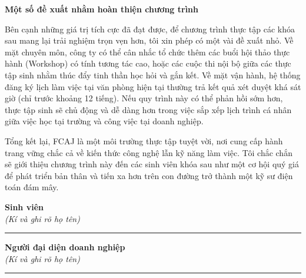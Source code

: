 \vspace{0.2cm}
\noindent\textbf{Một số đề xuất nhằm hoàn thiện chương trình}

Bên cạnh những giá trị tích cực đã đạt được, để chương trình thực tập các khóa sau mang lại trải nghiệm trọn vẹn hơn, tôi xin phép có một vài đề xuất nhỏ. Về mặt chuyên môn, công ty có thể cân nhắc tổ chức thêm các buổi hội thảo thực hành (Workshop) có tính tương tác cao, hoặc các cuộc thi nội bộ giữa các thực tập sinh nhằm thúc đẩy tinh thần học hỏi và gắn kết. Về mặt vận hành, hệ thống đăng ký lịch làm việc tại văn phòng hiện tại thường trả kết quả xét duyệt khá sát giờ (chỉ trước khoảng 12 tiếng). Nếu quy trình này có thể phản hồi sớm hơn, thực tập sinh sẽ chủ động và dễ dàng hơn trong việc sắp xếp lịch trình cá nhân giữa việc học tại trường và công việc tại doanh nghiệp.

Tổng kết lại, FCAJ là một môi trường thực tập tuyệt vời, nơi cung cấp hành trang vững chắc cả về kiến thức công nghệ lẫn kỹ năng làm việc. Tôi chắc chắn sẽ giới thiệu chương trình này đến các sinh viên khóa sau như một cơ hội quý giá để phát triển bản thân và tiến xa hơn trên con đường trở thành một kỹ sư điện toán đám mây.
\vspace{1cm}

\begin{center}
\begin{minipage}[t]{0.4\textwidth}
    \centering
    \textbf{Sinh viên}\\[0.2cm]
    \textit{(Kí và ghi rõ họ tên)}\\[0.2cm]

    \vspace{2.5cm}

    \rule{0.8\linewidth}{0.4pt}
\end{minipage}
\hfill
\begin{minipage}[t]{0.4\textwidth}
    \centering
    \textbf{Người đại diện doanh nghiệp}\\[0.2cm]
    \textit{(Kí và ghi rõ họ tên)}\\[0.2cm]

    \vspace{2.5cm}

    \rule{0.8\linewidth}{0.4pt}
\end{minipage}
\end{center}